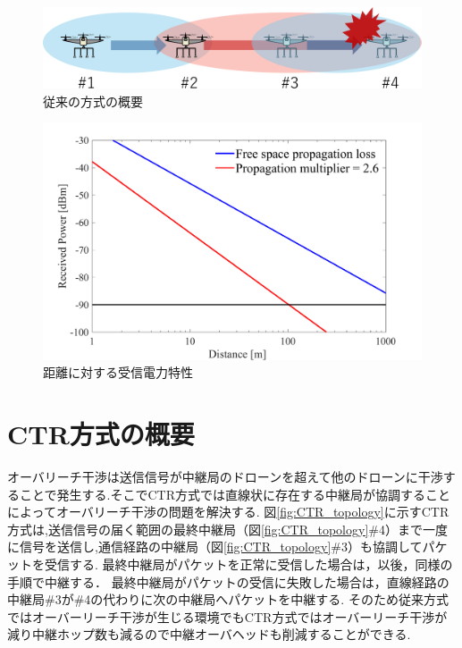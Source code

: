 \documentclass[a4paper,10.5pt]{ltjsarticle}
\begin{document}
\begin{figure}[H]
  \centering
  \includegraphics[width=\linewidth]{cenventional_topology.pdf} %
  \caption{従来の方式の概要}
  \label{fig:conventional_topology} %
\end{figure}

\begin{figure}[H]
  \centering
  \includegraphics[width=\linewidth]{lfsp_vs_distance_3.pdf} %
  \caption{距離に対する受信電力特性}
  \label{fig:lfsp_vs_distance_3} %
\end{figure}

\clearpage
\section{CTR方式の概要}

オーバリーチ干渉は送信信号が中継局のドローンを超えて他のドローンに干渉することで発生する.そこでCTR方式では直線状に存在する中継局が協調することによってオーバリーチ干渉の問題を解決する.
図\ref{fig:CTR_topology}に示すCTR方式は,送信信号の届く範囲の最終中継局（図\ref{fig:CTR_topology}\#4）まで一度に信号を送信し,通信経路の中継局（図\ref{fig:CTR_topology}\#3）も協調してパケットを受信する.
最終中継局がパケットを正常に受信した場合は，以後，同様の手順で中継する．
最終中継局がパケットの受信に失敗した場合は，直線経路の中継局\#3が\#4の代わりに次の中継局へパケットを中継する.
そのため従来方式ではオーバーリーチ干渉が生じる環境でもCTR方式ではオーバーリーチ干渉が減り中継ホップ数も減るので中継オーバヘッドも削減することができる.
\end{document}
